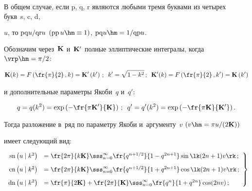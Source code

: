 В общем случае, если p, q, r являются любыми тремя буквами  из четырех букв~s, c, d, 

$u$, то ${\mathrm{pq}} u/{\mathrm{qr}} u$ $(\mathrm{pp}\, u\hm\equiv 1)$, $\pq u \hm=1/\qp u$.



Обозначим через~${\mathbf{K}}$  и~${\mathbf{K}}'$ полные эллиптические интегралы, когда $\vrp \hm= \pi/2$:

    \begin{equation*}

    \bK (k) = F\left(\fr{\pi}{2}\,, k\right) = \bK'\left(k'\right)\,; \enskip 

    k'=\sqrt{1-k^2}\,;\enskip 

    \bK'(k) = F\left(\fr{\pi}{2}\,,k'\right) = \bK\left(k'\right)


    \end{equation*}

и дополнительные параметры Якоби~$q$  и~$q'$:

    \begin{equation*}

    q= q(k^2) = \exp \left( - \fr{\pi \bK'}{\bK}\right)\,;\enskip 

    q'= q'(k^2) = \exp \left( - \fr{\pi \bK}{\bK'}\right).


    \end{equation*}

Тогда разложение в~ряд по параметру Якоби и~аргументу~$v$ $(v\hm= \pi u /(2 \bK))$

 имеет следующий вид:

   \begin{equation}

   \left.

   \begin{array}{rl}

\sn \left(u\mid k^2\right) &= \fr{2\pi}{k\bK} \sss_{n=0}^\infty \fr{q^{n+1/2}}{1-q^{2n+1}}

     \sin \lk (2n+1)v\rk\,;\\[9pt]

         \cn \left(u\mid k^2\right) &= \fr{2\pi}{k\bK} \sss_{n=0}^\infty \fr{q^{n+1/2}}

    {1+q^{2n+1}} \cos \lk (2n+1)v\rk\,;\\[9pt]

    \dn \left(u\mid k^2\right) &= \fr{\pi}{2\bK} +\fr{2\pi}{\bK}

    \sss_{n=0}^\infty \fr{q^{n}}{1+q^{2n}} \cos  (2nv)\,;

    \end{array}

    \right\}

    \label{e2.7-s1}

\end{equation}



